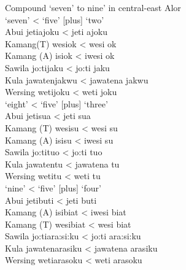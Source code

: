 \let\eachwordone=\rm
\let\eachwordtwo=\it
\let\eachwordthree=\it
\let\eachwordfour=\it
\let\eachwordfive=\it
\let\eachwordsix=\it
\let\eachwordseven=\it

\ea%
\label{ex:6:6}
\upshape Compound `seven' to nine' in central-east Alor\\
\ea
\glllllll   { }    		`seven'      		{\textless}  `five'  		[plus]  `two' \\
{\rm Abui}    		{jeti}{{\ng}}{ajoku}    	{\textless}  {jeti}{{\ng}} 	{}   	{ajoku}\\
{\rm Kamang(T)}  	{wesi}{{\ng}}{ok} 	{\textless}  {wesi}{{\ng}}   	{} 	{ok}\\
{\rm Kamang{ }(A)}  		{isi{\ng}ok}      	{\textless}  {iwesi{\ng}}  	{}  	{ok}\\
{\rm Sawila}    	{jo:ti{\ng}jaku}     	{\textless}  {jo:ti{\ng}} 	{}   	{jaku}\\
{\rm Kula}    		{jawatenjakwu}    	{\textless}  {jawatena} 		{} 	{jakwu}\\
{\rm Wersing}  	{weti{\ng}joku}    	{\textless}  {weti{\ng}} 	{}	{joku}\\
\ex 
\glllllll    { } 	`eight'      		{\textless}  `five'  	[plus]  `three'\\
{\rm Abui}    		{jeti}{{\ng}}{sua}    	{\textless}  {jeti{\ng}} 	{} {sua}\\
{\rm Kamang{ }(T)}  	{wesi{\ng}su}   		{\textless}  {wesi{\ng}} {}  {su}\\
{\rm Kamang{ }(A)}  	{isi{\ng}su}      	{\textless}  {iwesi{\ng}} {}  {su}\\
{\rm Sawila}   	 	{jo:ti{\ng}tuo}     	{\textless}  {jo:ti{\ng}}  {}  {tuo}\\
{\rm Kula}    		{jawatentu}   		{\textless} {jawatena} 	{} {tu}\\
{\rm Wersing}  		{weti{\ng}tu}      	{\textless}  {weti{\ng}} 	{}   {tu}\\
\ex   
\glllllll    { }   	`nine'      		{\textless}  `five'  	[plus]  `four' \\
{\rm Abui}    		{jeti}{{\ng}}{buti}    	{\textless}  {jeti{\ng}}  {}    {buti}\\
{\rm Kamang{ }(A)}  	{isi{\ng}biat}   	{\textless}  {iwesi{\ng}}  {}  {biat}\\
{\rm Kamang{ }(T)}	{wesi{\ng}biat}  	{\textless}  {wesi{\ng}}  {}  {biat}\\
{\rm Sawila}   		{jo:ti{\ng}ara:si:ku} 	{\textless}  {jo:ti{\ng}}  {}  {ara:si:ku}\\
{\rm Kula}    		{jawatenarasiku}  	{\textless}  {jawatena}  {}  {arasiku}\\
{\rm Wersing}  		{weti{\ng}arasoku}    	{\textless}  {weti{\ng}}   {}   {arasoku}\\
\z
\z


